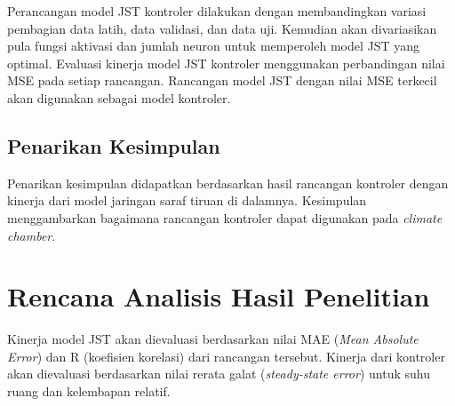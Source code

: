 Perancangan model JST kontroler dilakukan dengan membandingkan variasi pembagian data latih, data validasi, dan data uji. Kemudian akan divariasikan pula fungsi aktivasi dan jumlah neuron untuk memperoleh model JST yang optimal. Evaluasi kinerja model JST kontroler menggunakan perbandingan nilai MSE pada setiap rancangan. Rancangan model JST dengan nilai MSE terkecil akan digunakan sebagai model kontroler.

\subsection{Penarikan Kesimpulan}
Penarikan kesimpulan didapatkan berdasarkan hasil rancangan kontroler dengan kinerja dari model jaringan saraf tiruan di dalamnya. Kesimpulan menggambarkan bagaimana rancangan kontroler dapat digunakan pada \textit{climate chamber}.

\section{Rencana Analisis Hasil Penelitian}
Kinerja model JST akan dievaluasi berdasarkan nilai MAE (\textit{Mean Absolute Error}) dan R (koefisien korelasi) dari rancangan tersebut. Kinerja dari kontroler akan dievaluasi berdasarkan nilai rerata galat (\textit{steady-state error}) untuk suhu ruang dan kelembapan relatif.